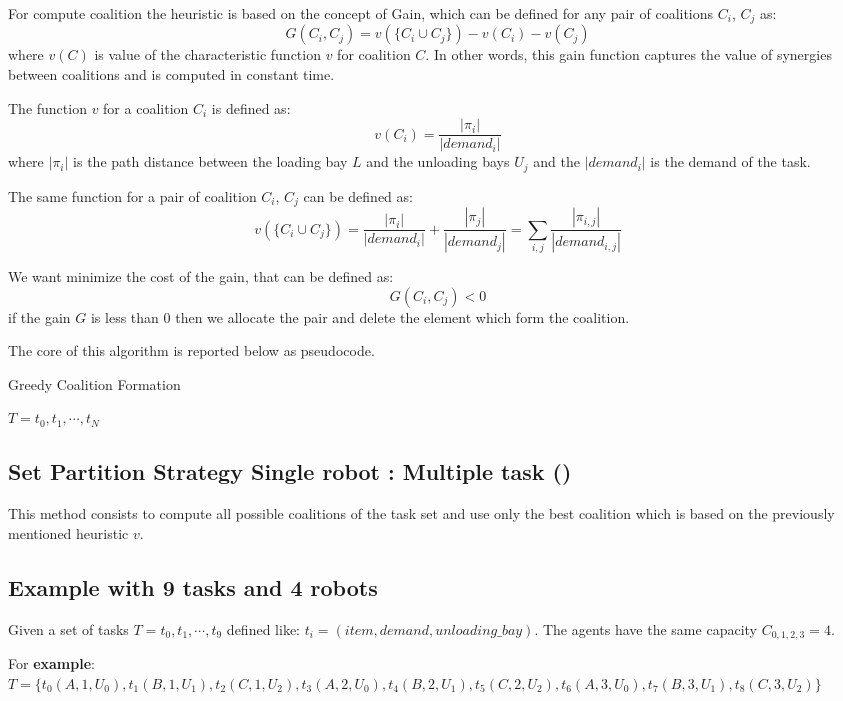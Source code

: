 For compute coalition the heuristic is based on the concept of Gain, which can be 
defined for any pair of coalitions $C_i$, $C_j$ as:
\[G(C_i,C_j) = v(\{C_i \cup C_j\}) - v(C_i) - v(C_j)\]
where $v(C)$ is value of the characteristic function $v$ for coalition $C$. 
In other words, this gain function captures the value of synergies between coalitions
and is computed in constant time.

The function $v$ for a coalition $C_i$ is defined as:
\[ v(C_i) = \frac{|\pi_i|}{|demand_i|}\]
where $|\pi_i|$ is the path distance between the loading bay $L$ and the unloading bays $U_j$
and the $|demand_i|$ is the demand of the task.

The same function for a pair of coalition $C_i$, $C_j$ can be defined as:
\[  v(\{C_i \cup C_j\}) = \frac{|\pi_i|}{|demand_i|} + \frac{|\pi_j|}{|demand_j|} = \sum_{i,j} \frac{|\pi_{i,j}|}{|demand_{i,j}|} \]

We want minimize the cost of the gain, that can be defined as:
\[G(C_i,C_j) < 0 \]
if the gain $G$ is less than 0 then we allocate the pair and delete the element which
form the coalition.

The core of this algorithm is reported below as pseudocode.
\begin{algorithm}
    \caption{Greedy Coalition Formation}\label{GSF}
    $T = {{t_0},{t_1}, \cdots, {t_N}}$
\end{algorithm}

\subsection{Set Partition Strategy Single robot : Multiple task (\sps)}

This method consists to compute all possible coalitions of the task set and use only 
the best coalition which is based on the previously mentioned heuristic $v$.

\subsection*{Example with 9 tasks and 4 robots}
Given a set of tasks $T = {{{t_0},{t_1}, \cdots, {t_9}}}$ defined like: 
${t_i=(item, demand, unloading\_bay)}$. The agents have the same capacity $C_{0,1,2,3} = 4$.

For \textbf{example}:
\newline
$T=\{t_0(A,1,U_0), t_1(B,1,U_1), t_2(C,1,U_2), t_3(A,2,U_0), t_4(B,2,U_1),t_5(C,2,U_2), t_6(A,3,U_0), t_7(B,3,U_1), t_8(C,3,U_2)\}$

